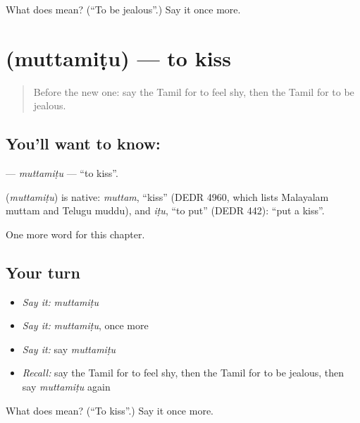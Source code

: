 \begin{tcolorbox}[breakable,colback=teal!4,colframe=teal!35!black,title={Before you move on}]
What does  mean? (\textquotedblleft{}To be jealous\textquotedblright{}.) Say it once more.
\end{tcolorbox}
\section[\texorpdfstring{\ta{முத்தமிடு} (muttamiṭu)}{முத்தமிடு (muttamiṭu)}]{ (muttamiṭu) — to kiss}

\label{lesson:TA-C257-muttamitu}



\begin{quote}
Before the new one: say the Tamil for to feel shy, then the Tamil for to be jealous.
\end{quote}

\subsection*{You'll want to know: }
\textbf{} — \emph{muttamiṭu} — \textquotedblleft{}to kiss\textquotedblright{}.

\begin{cousinweb}
\textbf{} (\emph{muttamiṭu}) is native: \emph{muttam}, \textquotedblleft{}kiss\textquotedblright{} (DEDR 4960, which lists Malayalam muttam and Telugu muddu), and \emph{iṭu}, \textquotedblleft{}to put\textquotedblright{} (DEDR 442): \textquotedblleft{}put a kiss\textquotedblright{}.
\end{cousinweb}

\begin{grammarlens}[title={What you've built}]
One more word for this chapter.
\end{grammarlens}

\subsection*{Your turn}
\begin{itemize}
\raggedright
  \item \emph{Say it:} \emph{muttamiṭu}
  \item \emph{Say it:} \emph{muttamiṭu}, once more
  \item \emph{Say it:} say \emph{muttamiṭu}
  \item \emph{Recall:} say the Tamil for to feel shy, then the Tamil for to be jealous, then say \emph{muttamiṭu} again
\end{itemize}

\begin{tcolorbox}[breakable,colback=teal!4,colframe=teal!35!black,title={Before you move on}]
What does  mean? (\textquotedblleft{}To kiss\textquotedblright{}.) Say it once more.
\end{tcolorbox}
